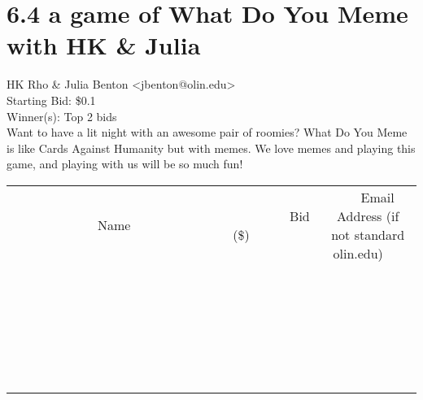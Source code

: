 \documentclass[11pt]{article}
\begin{document}
					\section*{6.4 a game of What Do You Meme with HK \& Julia}
					HK Rho \& Julia Benton <jbenton@olin.edu> \\
					Starting Bid: \$0.1 \\
					Winner(s): Top 2 bids \\
					Want to have a lit night with an awesome pair of roomies? What Do You Meme is like Cards Against Humanity but with memes. We love memes and playing this game, and playing with us will be so much fun! \\
					[6ex]
					\begin{tabular}{c c c}
						~~~~~~~~~~~~~Name~~~~~~~~~~~~~ & ~~~~~~~~~Bid (\$)~~~~~~~~~ & ~~~Email Address (if not standard olin.edu)~~~ \\
				
 & & \\
\hline
 & & \\
\hline
 & & \\
\hline
 & & \\
\hline
 & & \\
\hline
 & & \\
\hline
 & & \\
\hline
 & & \\
\hline
 & & \\
\hline
 & & \\
\hline
 & & \\
\hline
 & & \\
\hline
 & & \\
\hline
 & & \\
\hline
 & & \\
\hline
 & & \\
\hline
 & & \\
\hline
 & & \\
\hline
 & & \\
\hline
 & & \\
\hline
 & & \\
\hline
 & & \\
\hline
 & & \\
\hline
 & & \\
\hline
 & & \\
\hline
 & & \\
\hline
					\end{tabular}
					\clearpage
				
\end{document}
